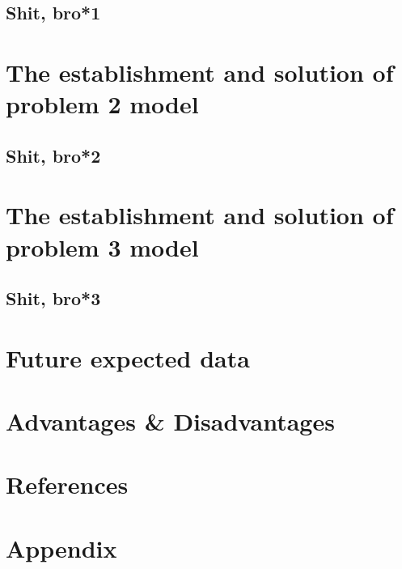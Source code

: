 \documentclass[12pt]{article}
\begin{document}
	\subsection{Shit, bro*1}\label{subsec:shit-bro*1} %
	
\section{The establishment and solution of problem 2 model}\label{sec:the-establishment-and-solution-of-problem-2-model} %
	\subsection{Shit, bro*2}\label{subsec:shit-bro*2} %
	
\section{The establishment and solution of problem 3 model}\label{sec:the-establishment-and-solution-of-problem-3-model} %
	\subsection{Shit, bro*3}\label{subsec:shit-bro*3} %
	
\section{Future expected data}\label{sec:future-expected-data} %

\section{Advantages \& Disadvantages}\label{sec:advantages-&-disadvantages} %

\section{References}\label{sec:references} %

\section{Appendix}\label{sec:appendix} %
\end{document}
